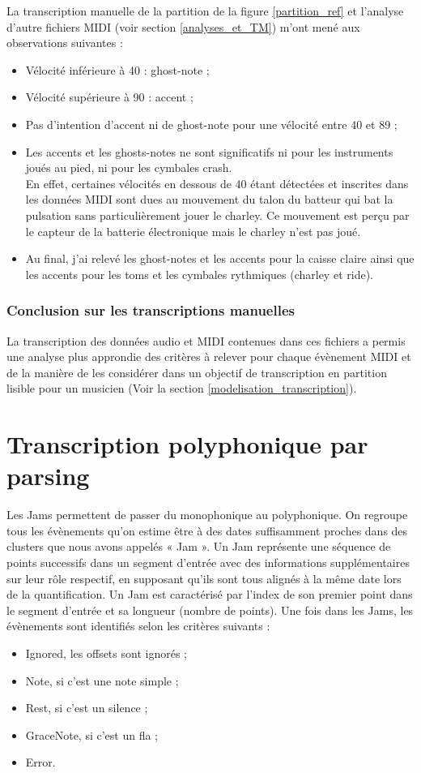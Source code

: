 La transcription manuelle de la partition de la figure \ref{partition_ref} et
l'analyse d'autre fichiers MIDI (voir section \ref{analyses_et_TM}) m’ont mené
aux observations suivantes :
\begin{itemize}
	\item Vélocité inférieure à 40 : ghost-note ;
	\item Vélocité supérieure à 90 : accent ;
	\item Pas d’intention d’accent ni de ghost-note pour une vélocité entre 40
        et 89 ;
	\item Les accents et les ghosts-notes ne sont significatifs ni pour les
        instruments joués au pied, ni pour les cymbales crash.\\
	En effet, certaines vélocités en dessous de 40 étant détectées et inscrites
    dans les données MIDI sont dues au mouvement du talon du batteur qui bat la
    pulsation sans particulièrement jouer le charley. Ce mouvement est perçu
    par le capteur de la batterie électronique mais le charley n’est pas joué.
	\item Au final, j’ai relevé les ghost-notes et les accents pour la caisse
        claire ainsi que les accents pour les toms et les cymbales rythmiques
        (charley et ride).
\end{itemize}


\subsubsection{Conclusion sur les transcriptions manuelles}
La transcription des données audio et MIDI contenues dans ces fichiers a permis
une analyse plus approndie des critères à relever pour chaque évènement MIDI et
de la manière de les considérer dans un objectif de transcription en partition
lisible pour un musicien (Voir la section \ref{modelisation_transcription}).


\section{Transcription polyphonique par parsing}
\label{jam}
Les Jams permettent de passer du monophonique au polyphonique.
On regroupe tous les évènements qu’on estime être à des dates suffisamment
proches dans des clusters que nous avons appelés « Jam ».
Un Jam représente une séquence de points successifs dans un segment d'entrée
avec des informations supplémentaires sur leur rôle respectif, en supposant
qu'ils sont tous alignés à la même date lors de la quantification. Un Jam est
caractérisé par l'index de son premier point dans le segment d'entrée et sa
longueur (nombre de points).
Une fois dans les Jams, les évènements sont identifiés selon les critères
suivants :
\begin{itemize}
    \item Ignored, les offsets sont ignorés ;
    \item Note, si c’est une note simple ;
    \item Rest, si c’est un silence ;
    \item GraceNote, si c’est un fla ;
    \item Error.
\end{itemize}


